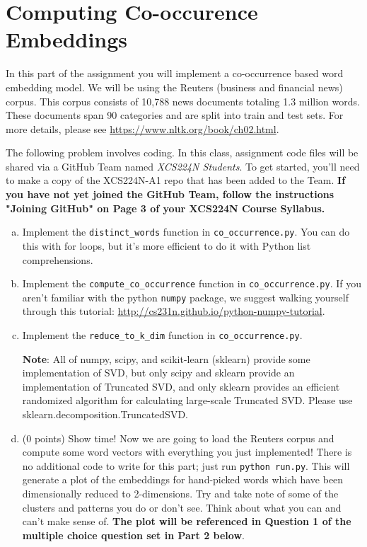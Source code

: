 \section{Computing Co-occurence Embeddings}
In this part of the assignment you will implement a co-occurrence based word embedding model. We will be using the Reuters (business and financial news) corpus. This corpus consists of 10,788 news documents totaling 1.3 million words. These documents span 90 categories and are split into train and test sets. For more details, please see \url{https://www.nltk.org/book/ch02.html}. \newline

The following problem involves coding. In this class, assignment code files will be shared via a GitHub Team named \textit{XCS224N Students}. To get started, you'll need to make a copy of the XCS224N-A1 repo that has been added to the Team. \textbf{If you have not yet joined the GitHub Team, follow the instructions "Joining GitHub" on Page 3 of your XCS224N Course Syllabus.}

\begin{enumerate}[(a)]
    \item {} Implement the \texttt{distinct\_words} function in \texttt{co\_occurrence.py}. You can do this with for loops, but it's more efficient to do it with Python list comprehensions.
    
    \item {} Implement the \texttt{compute\_co\_occurrence} function in \texttt{co\_occurrence.py}. If you aren't familiar with the python \texttt{numpy} package, we suggest walking yourself through this tutorial: \url{http://cs231n.github.io/python-numpy-tutorial}. 
    
    \item {} Implement the \texttt{reduce\_to\_k\_dim} function in \texttt{co\_occurrence.py}. \newline
    
    \textbf{Note}: All of numpy, scipy, and scikit-learn (sklearn) provide some implementation of SVD, but only scipy and sklearn provide an implementation of Truncated SVD, and only sklearn provides an efficient randomized algorithm for calculating large-scale Truncated SVD. Please use sklearn.decomposition.TruncatedSVD.
    
    
    \item (0 points) Show time! Now we are going to load the Reuters corpus and compute some word vectors with everything you just implemented! There is no additional code to write for this part; just run \texttt{python run.py}. This will generate a plot of the embeddings for hand-picked words which have been dimensionally reduced to 2-dimensions. Try and take note of some of the clusters and patterns you do or don't see. Think about what you can and can't make sense of. \textbf{The plot will be referenced in Question 1 of the multiple choice question set in Part 2 below}. 
\end{enumerate}

